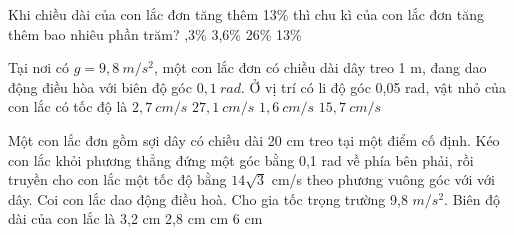 \begin{vidu} %
Khi chiều dài của con lắc đơn tăng thêm 13\% thì chu kì của con lắc đơn tăng thêm bao nhiêu phần trăm?
\choice
{,3\%}
{3,6\%}
{26\%}
{13\%}

\end{vidu} %
\begin{vidu} %
 Tại nơi có $g = 9,8\ m/s^2$, một con lắc đơn có chiều dài dây treo 1 m, đang dao động điều hòa với biên độ góc $0,1\ rad$. Ở vị trí có li độ góc 0,05 rad, vật nhỏ của con lắc có tốc độ là
\choice
{$2,7\ cm/s$}
{\True $27,1\ cm/s$}
{$1,6\ cm/s$}
{$15,7\ cm/s$}
\end{vidu} %
\begin{vidu} %
Một con lắc đơn gồm sợi dây có chiều dài 20 cm treo tại một điểm cố định. Kéo con lắc khỏi phương thẳng đứng một góc bằng 0,1 rad về phía bên phải, rồi truyền cho con lắc một tốc độ bằng $14\sqrt{3}$ cm/s theo phương vuông góc với với dây. Coi con lắc dao động điều hoà. Cho gia tốc trọng trường 9,8 $m/s^2$. Biên độ dài của con lắc là
\choice
{3,2 cm}
{2,8 cm}
{ cm}
{6 cm}
\end{vidu} %
